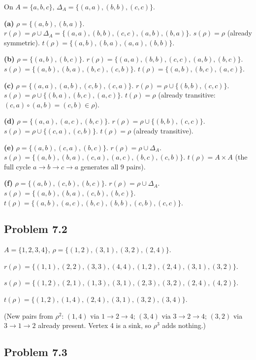 On $A=\{a,b,c\}$, $\Delta_A=\{(a,a),(b,b),(c,c)\}$.

\textbf{(a)} $\rho=\{(a,b),(b,a)\}$.
$r(\rho)=\rho\cup\Delta_A=\{(a,a),(b,b),(c,c),(a,b),(b,a)\}$.
$s(\rho)=\rho$ (already symmetric).
$t(\rho)=\{(a,b),(b,a),(a,a),(b,b)\}$.

\textbf{(b)} $\rho=\{(a,b),(b,c)\}$.
$r(\rho)=\{(a,a),(b,b),(c,c),(a,b),(b,c)\}$.
$s(\rho)=\{(a,b),(b,a),(b,c),(c,b)\}$.
$t(\rho)=\{(a,b),(b,c),(a,c)\}$.

\textbf{(c)} $\rho=\{(a,a),(a,b),(c,b),(c,a)\}$.
$r(\rho)=\rho\cup\{(b,b),(c,c)\}$.
$s(\rho)=\rho\cup\{(b,a),(b,c),(a,c)\}$.
$t(\rho)=\rho$ (already transitive: $(c,a)\circ(a,b)=(c,b)\in\rho$).

\textbf{(d)} $\rho=\{(a,a),(a,c),(b,c)\}$.
$r(\rho)=\rho\cup\{(b,b),(c,c)\}$.
$s(\rho)=\rho\cup\{(c,a),(c,b)\}$.
$t(\rho)=\rho$ (already transitive).

\textbf{(e)} $\rho=\{(a,b),(c,a),(b,c)\}$.
$r(\rho)=\rho\cup\Delta_A$.
$s(\rho)=\{(a,b),(b,a),(c,a),(a,c),(b,c),(c,b)\}$.
$t(\rho)=A\times A$ (the full cycle $a\to b\to c\to a$ generates all 9 pairs).

\textbf{(f)} $\rho=\{(a,b),(c,b),(b,c)\}$.
$r(\rho)=\rho\cup\Delta_A$.
$s(\rho)=\{(a,b),(b,a),(c,b),(b,c)\}$.
$t(\rho)=\{(a,b),(a,c),(b,c),(b,b),(c,b),(c,c)\}$.


\subsection*{Problem 7.2}

$A=\{1,2,3,4\}$, $\rho=\{(1,2),(3,1),(3,2),(2,4)\}$.

$\boxed{r(\rho)=\{(1,1),(2,2),(3,3),(4,4),(1,2),(2,4),(3,1),(3,2)\}}$.

$\boxed{s(\rho)=\{(1,2),(2,1),(1,3),(3,1),(2,3),(3,2),(2,4),(4,2)\}}$.

$\boxed{t(\rho)=\{(1,2),(1,4),(2,4),(3,1),(3,2),(3,4)\}}$.

(New pairs from $\rho^2$: $(1,4)$ via $1\!\to\!2\!\to\!4$; $(3,4)$ via $3\!\to\!2\!\to\!4$; $(3,2)$ via $3\!\to\!1\!\to\!2$ already present. Vertex 4 is a sink, so $\rho^3$ adds nothing.)


\subsection*{Problem 7.3}

